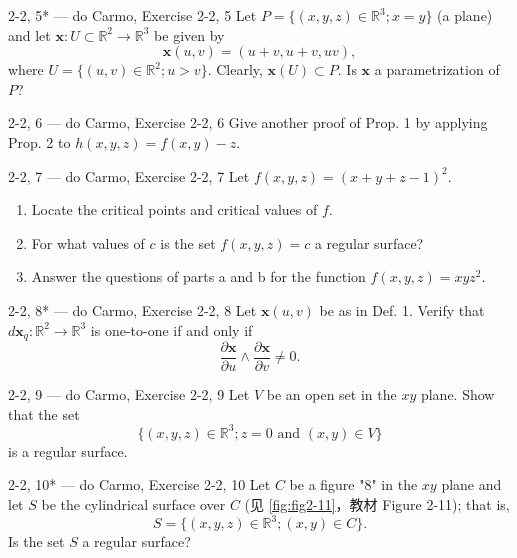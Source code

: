 \begin{exercise}{2-2, 5* — do Carmo, Exercise 2-2, 5}
Let $P = \{(x, y, z) \in \mathbb{R}^3; x = y\}$ (a plane) and let $\mathbf{x}: U \subset \mathbb{R}^2 \to \mathbb{R}^3$ be given by
\[
\mathbf{x}(u, v) = (u + v, u + v, uv),
\]
where $U = \{(u,v)\in \mathbb{R}^2;u > v\}$. Clearly, $\mathbf{x}(U)\subset P$. Is $\mathbf{x}$ a parametrization of $P$?
\end{exercise}

\begin{exercise}{2-2, 6 — do Carmo, Exercise 2-2, 6}
Give another proof of Prop. 1 by applying Prop. 2 to $h(x, y, z) = f(x, y) - z$.
\end{exercise}

\begin{exercise}{2-2, 7 — do Carmo, Exercise 2-2, 7}
Let $f(x, y, z) = (x + y + z - 1)^2$.
\begin{enumerate}
\item[a.] Locate the critical points and critical values of $f$.
\item[b.] For what values of $c$ is the set $f(x, y, z) = c$ a regular surface?
\item[c.] Answer the questions of parts a and b for the function $f(x, y, z) = xyz^2$.
\end{enumerate}
\end{exercise}

\begin{exercise}{2-2, 8* — do Carmo, Exercise 2-2, 8}
Let $\mathbf{x}(u, v)$ be as in Def. 1. Verify that $d\mathbf{x}_q: \mathbb{R}^2 \to \mathbb{R}^3$ is one-to-one if and only if
\[
\frac{\partial \mathbf{x}}{\partial u} \wedge \frac{\partial \mathbf{x}}{\partial v} \neq 0.
\]
\end{exercise}

\begin{exercise}{2-2, 9 — do Carmo, Exercise 2-2, 9}
Let $V$ be an open set in the $xy$ plane. Show that the set
\[
\{(x, y, z) \in \mathbb{R}^3; z = 0 \text{ and } (x, y) \in V\}
\]
is a regular surface.
\end{exercise}

\begin{exercise}{2-2, 10* — do Carmo, Exercise 2-2, 10}
Let $C$ be a figure "8" in the $xy$ plane and let $S$ be the cylindrical surface over $C$ (见 \cref{fig:fig2-11}，教材 Figure 2-11); that is,
\[
S = \{(x, y, z) \in \mathbb{R}^3; (x, y) \in C \}.
\]
Is the set $S$ a regular surface?
\end{exercise}

